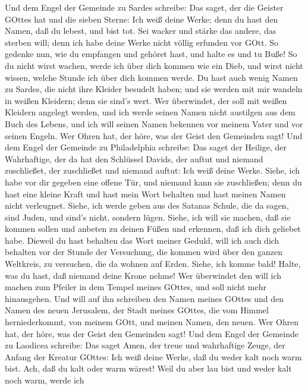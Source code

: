  Und dem Engel der Gemeinde zu Sardes schreibe: Das saget,
der die Geister GOttes hat und die sieben Sterne: Ich weiß deine Werke;
denn du hast den Namen, daß du lebest, und bist tot.  Sei
wacker und stärke das andere, das sterben will; denn ich habe deine
Werke nicht völlig erfunden vor GOtt.  So gedenke nun, wie
du empfangen und gehöret hast, und halte es und tu Buße! So du nicht
wirst wachen, werde ich über dich kommen wie ein Dieb, und wirst nicht
wissen, welche Stunde ich über dich kommen werde.  Du hast
auch wenig Namen zu Sardes, die nicht ihre Kleider besudelt haben; und
sie werden mit mir wandeln in weißen Kleidern; denn sie sind's wert.
 Wer überwindet, der soll mit weißen Kleidern angelegt
werden, und ich werde seinen Namen nicht austilgen aus dem Buch des
Lebens, und ich will seinen Namen bekennen vor meinem Vater und vor
seinen Engeln.  Wer Ohren hat, der höre, was der Geist den
Gemeinden sagt!  Und dem Engel der Gemeinde zu Philadelphia
schreibe: Das saget der Heilige, der Wahrhaftige, der da hat den
Schlüssel Davids, der auftut und niemand zuschließet, der zuschließet
und niemand auftut:  Ich weiß deine Werke. Siehe, ich habe
vor dir gegeben eine offene Tür, und niemand kann sie zuschließen; denn
du hast eine kleine Kraft und hast mein Wort behalten und hast meinen
Namen nicht verleugnet.  Siehe, ich werde geben aus des
Satanas Schule, die da sagen, sind Juden, und sind's nicht, sondern
lügen. Siehe, ich will sie machen, daß sie kommen sollen und anbeten zu
deinen Füßen und erkennen, daß ich dich geliebet habe. 
Dieweil du hast behalten das Wort meiner Geduld, will ich auch dich
behalten vor der Stunde der Versuchung, die kommen wird über den ganzen
Weltkreis, zu versuchen, die da wohnen auf Erden.  Siehe,
ich komme bald! Halte, was du hast, daß niemand deine Krone nehme!
 Wer überwindet den will ich machen zum Pfeiler in dem
Tempel meines GOttes, und soll nicht mehr hinausgehen. Und will auf ihn
schreiben den Namen meines GOttes und den Namen des neuen Jerusalem, der
Stadt meines GOttes, die vom Himmel herniederkommt, von meinem GOtt, und
meinen Namen, den neuen.  Wer Ohren hat, der höre, was der
Geist den Gemeinden sagt!  Und dem Engel der Gemeinde zu
Laodicea schreibe: Das saget Amen, der treue und wahrhaftige Zeuge, der
Anfang der Kreatur GOttes:  Ich weiß deine Werke, daß du
weder kalt noch warm bist. Ach, daß du kalt oder warm wärest!
 Weil du aber lau bist und weder kalt noch warm, werde ich
